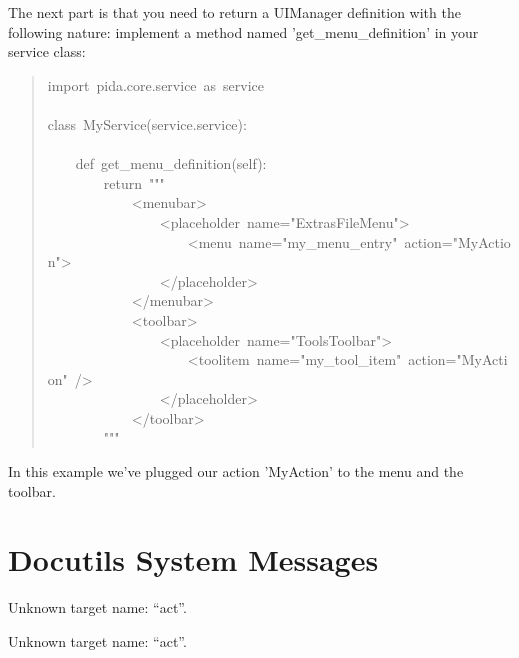 \documentclass[10pt,a4paper,english]{article}
\begin{document}
The next part is that you need to
return a UIManager definition with the following nature: implement a method
named 'get{\_}menu{\_}definition' in your service class:
\begin{quote}{\ttfamily \raggedright \noindent
import~pida.core.service~as~service~\\
~\\
class~MyService(service.service):~\\
~\\
~~~~def~get{\_}menu{\_}definition(self):~\\
~~~~~~~~return~"{}"{}"~\\
~~~~~~~~~~~~<menubar>~\\
~~~~~~~~~~~~~~~~<placeholder~name="ExtrasFileMenu">~\\
~~~~~~~~~~~~~~~~~~~~<menu~name="my{\_}menu{\_}entry"~action="MyAction">~\\
~~~~~~~~~~~~~~~~</placeholder>~\\
~~~~~~~~~~~~</menubar>~\\
~~~~~~~~~~~~<toolbar>~\\
~~~~~~~~~~~~~~~~<placeholder~name="ToolsToolbar">~\\
~~~~~~~~~~~~~~~~~~~~<toolitem~name="my{\_}tool{\_}item"~action="MyAction"~/>~\\
~~~~~~~~~~~~~~~~</placeholder>~\\
~~~~~~~~~~~~</toolbar>~\\
~~~~~~~~"{}"{}"
}\end{quote}

In this example we've plugged our action 'MyAction' to the menu and the toolbar.



\section*{Docutils System Messages}

Unknown target name: ``act''.


Unknown target name: ``act''.
\end{document}
